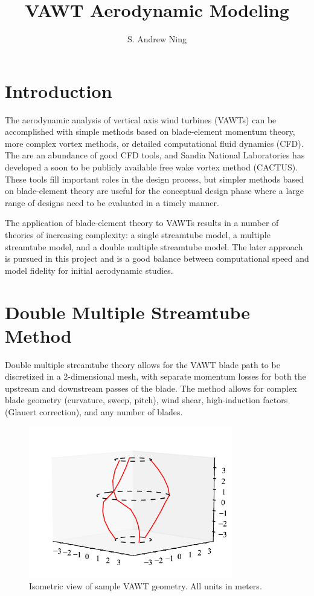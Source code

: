 \documentclass{article}
\begin{document}
\author{S. Andrew Ning}
\title{VAWT Aerodynamic Modeling}
\maketitle

\section{Introduction}
The aerodynamic analysis of vertical axis wind turbines (VAWTs) can be accomplished with simple methods based on blade-element momentum theory, more complex vortex methods, or detailed computational fluid dynamics (CFD).  The are an abundance of good CFD tools, and Sandia National Laboratories has developed a soon to be publicly available free wake vortex method (CACTUS).  These tools fill important roles in the design process, but simpler methods based on blade-element theory are useful for the conceptual design phase where a large range of designs need to be evaluated in a timely manner.

The application of blade-element theory to VAWTs results in a number of theories of increasing complexity: a single streamtube model, a multiple streamtube model, and a double multiple streamtube model.  The later approach is pursued in this project and is a good balance between computational speed and model fidelity for initial aerodynamic studies.

\section{Double Multiple Streamtube Method}
Double multiple streamtube theory allows for the VAWT blade path to be discretized in a 2-dimensional mesh, with separate momentum losses for both the upstream and downstream passes of the blade.  The method allows for complex blade geometry (curvature, sweep, pitch), wind shear, high-induction factors (Glauert correction), and any number of blades.

\begin{figure}[htbp]
\begin{center}
\includegraphics[width=3.5in]{geometry}
\caption{Isometric view of sample VAWT geometry.  All units in meters.}
\label{fig:geometry}
\end{center}
\end{figure}
\end{document}
